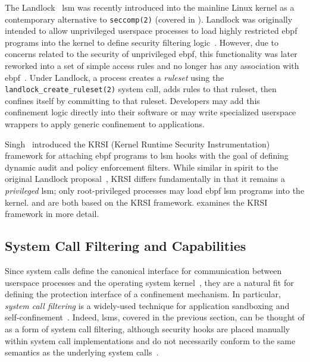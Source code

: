 The Landlock~\cite{salaun_landlockio, salaun_landlock_patch} \gls{lsm} was recently
introduced into the mainline Linux kernel as a contemporary alternative to
\texttt{seccomp(2)} (covered in ). Landlock was originally intended to
allow unprivileged userspace processes to load highly restricted \gls{ebpf} programs into
the kernel to define security filtering logic~\cite{salaun_landlock_patch}. However, due
to concerns related to the security of unprivileged \gls{ebpf}, this functionality was
later reworked into a set of simple access rules and no longer has any association with
\gls{ebpf}~\cite{salaun_landlockio}. Under Landlock, a process creates a \textit{ruleset}
using the \texttt{landlock\_create\_ruleset(2)} system call, adds rules to that ruleset,
then confines itself by committing to that ruleset. Developers may add this confinement
logic directly into their software or may write specialized userspace wrappers to apply
generic confinement to applications.

Singh~\cite{singh2019_krsi} introduced the KRSI (Kernel Runtime Security Instrumentation)
framework for attaching \gls{ebpf} programs to \gls{lsm} hooks with the goal of defining
dynamic audit and policy enforcement filters. While similar in spirit to the original
Landlock proposal~\cite{salaun_landlock_patch}, KRSI differs fundamentally in that it
remains a \textit{privileged} \gls{lsm}; only root-privileged processes may load
\gls{ebpf} \gls{lsm} programs into the kernel. \bpfcontain{} and \bpfbox{} are both based
on the KRSI framework.  examines the KRSI framework in more
detail.




\subsection{System Call Filtering and Capabilities}%
\label{ss:syscall-filtering}

Since system calls define the canonical interface for communication between userspace
processes and the operating system kernel~\cite{jaeger2008_os_security}, they are
a natural fit for defining the protection interface of a confinement mechanism. In
particular, \textit{system call filtering} is a widely-used technique for application
sandboxing and self-confinement~\cite{anderson2017_comparison}. Indeed, \gls{lsm}s,
covered in the previous section, can be thought of as a form of system call filtering,
although security hooks are placed manually within system call implementations and do not
necessarily conform to the same semantics as the underlying system
calls~\cite{wright2002_lsm}.

